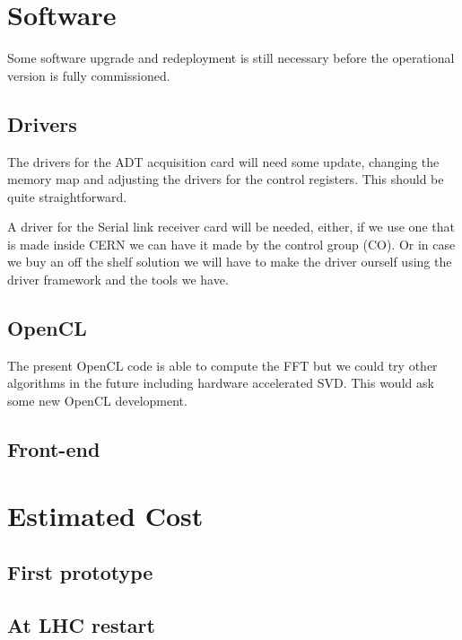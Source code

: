\section{Software}

Some software upgrade and redeployment is still necessary before the operational version is fully commissioned.

	\subsection{Drivers}

	The drivers for the \gls{ADT} acquisition card will need some update, changing the memory map and adjusting the drivers for the control registers. This should be quite straightforward.

	A driver for the Serial link receiver card will be needed, either, if we use one that is made inside \gls{CERN} we can have it made by the control group (CO). Or in case we buy an off the shelf solution we will have to make the driver ourself using the driver framework and the tools we have.

	\subsection{OpenCL}

	The present \gls{OpenCL} code is able to compute the \gls{FFT} but we could try other algorithms in the future including hardware accelerated \gls{SVD}. This would ask some new \gls{OpenCL} development.

	\subsection{Front-end}

	

\section{Estimated Cost}

	\subsection{First prototype}

	\subsection{At LHC restart}